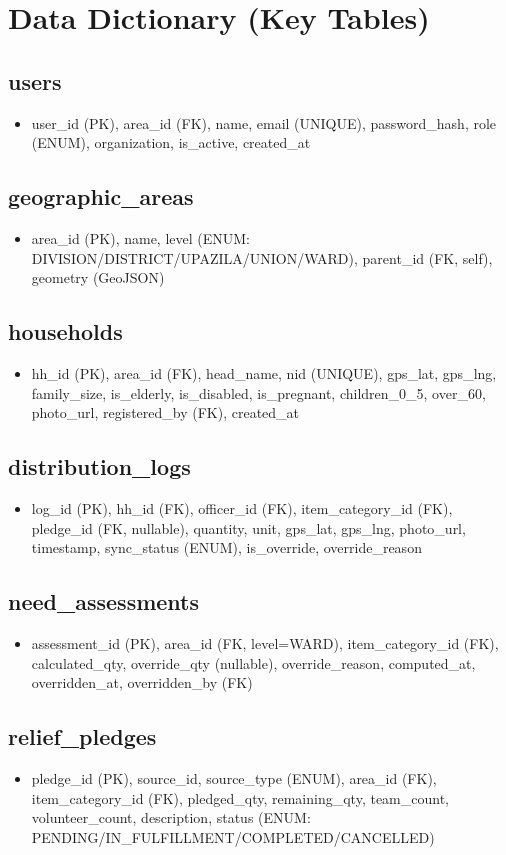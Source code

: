 \section{Data Dictionary (Key Tables)}

\subsection{users}
\begin{itemize}[nosep]
    \item user\_id (PK), area\_id (FK), name, email (UNIQUE), password\_hash, role (ENUM), organization, is\_active, created\_at
\end{itemize}

\subsection{geographic\_areas}
\begin{itemize}[nosep]
    \item area\_id (PK), name, level (ENUM: DIVISION/DISTRICT/UPAZILA/UNION/WARD), parent\_id (FK, self), geometry (GeoJSON)
\end{itemize}

\subsection{households}
\begin{itemize}[nosep]
    \item hh\_id (PK), area\_id (FK), head\_name, nid (UNIQUE), gps\_lat, gps\_lng, family\_size, is\_elderly, is\_disabled, is\_pregnant, children\_0\_5, over\_60, photo\_url, registered\_by (FK), created\_at
\end{itemize}

\subsection{distribution\_logs}
\begin{itemize}[nosep]
    \item log\_id (PK), hh\_id (FK), officer\_id (FK), item\_category\_id (FK), pledge\_id (FK, nullable), quantity, unit, gps\_lat, gps\_lng, photo\_url, timestamp, sync\_status (ENUM), is\_override, override\_reason
\end{itemize}

\subsection{need\_assessments}
\begin{itemize}[nosep]
    \item assessment\_id (PK), area\_id (FK, level=WARD), item\_category\_id (FK), calculated\_qty, override\_qty (nullable), override\_reason, computed\_at, overridden\_at, overridden\_by (FK)
\end{itemize}

\subsection{relief\_pledges}
\begin{itemize}[nosep]
    \item pledge\_id (PK), source\_id, source\_type (ENUM), area\_id (FK), item\_category\_id (FK), pledged\_qty, remaining\_qty, team\_count, volunteer\_count, description, status (ENUM: PENDING/IN\_FULFILLMENT/COMPLETED/CANCELLED)
\end{itemize}
